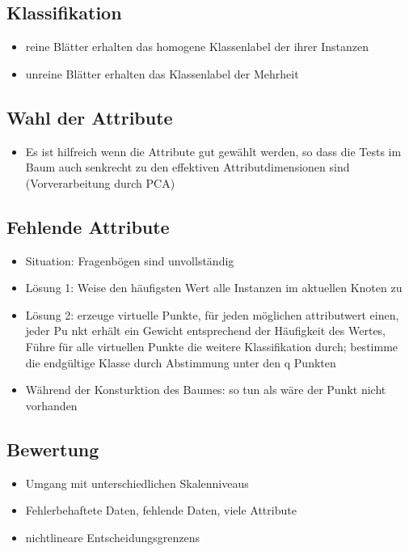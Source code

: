 \documentclass{article} %
\begin{document}
	\subsection{Klassifikation}
	\begin{itemize}
		\item reine Blätter erhalten das homogene Klassenlabel der ihrer Instanzen
		\item unreine Blätter erhalten das Klassenlabel der Mehrheit
	\end{itemize}
	\subsection{Wahl der Attribute}
	\begin{itemize}
		\item Es ist hilfreich wenn die Attribute gut gewählt werden, so dass die Tests im Baum auch senkrecht zu den effektiven Attributdimensionen sind (Vorverarbeitung durch PCA)
	\end{itemize}
	\subsection{Fehlende Attribute}
	\begin{itemize}
		\item Situation: Fragenbögen sind unvollständig
		\item Lösung 1: Weise den häufigsten Wert alle Instanzen im aktuellen Knoten zu
		\item Lösung 2: erzeuge virtuelle Punkte, für jeden möglichen attributwert einen, jeder Pu nkt erhält ein Gewicht entsprechend der Häufigkeit des Wertes, Führe für alle virtuellen Punkte die weitere Klassifikation durch; bestimme die endgültige Klasse durch Abstimmung unter den q Punkten
		\item Während der Konsturktion des Baumes: so tun als wäre der Punkt nicht vorhanden
	\end{itemize}
	\subsection{Bewertung}
	\begin{itemize}
		\item Umgang mit unterschiedlichen Skalenniveaus
		\item Fehlerbehaftete Daten, fehlende Daten, viele Attribute
		\item nichtlineare Entscheidungsgrenzens
	\end{itemize}


\end{document}
